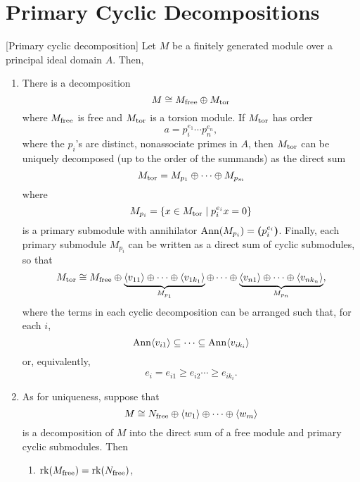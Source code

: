 \section{Primary Cyclic Decompositions}

\begin{thm}\label{thm:primary-cyclic-decomposition}
    {\rm[Primary cyclic decomposition]}
    Let\/ $M$ be a finitely generated module over a principal ideal domain\/ $A$. Then,

\begin{enumerate}[\rm a)]
    \item There is a decomposition
    $$
        M \cong M_{\rm free} \oplus M_{\rm tor}
    $$
    where\/ $M_{\rm free}$ is free and\/ $M_{\rm tor}$ is a torsion module. If\/ $M_{\rm tor}$ has order
    $$
        a=p_i^{e_1}\cdots p_n^{e_n},
    $$
    where the $p_i$'s are distinct, nonassociate primes in\/ $A$, then\/ $M_{\rm tor}$ can be uniquely decomposed (up to the order of the summands) as the direct sum
    $$
        M_{\rm tor} = M_{p_1} \oplus \cdots \oplus M_{p_m}
    $$
    where
    $$
        M_{p_i} = \{x \in M_{\rm tor} \mid p_i^{e_i}x=0\}
    $$
    is a primary submodule with annihilator\/ $\operatorname{\operatorname{Ann}}(M_{p_i}) = \textrm{\boldmath$($}p_i^{e_i}\textrm{\boldmath$)$}$. Finally, each primary submodule\/ $M_{p_i}$ can be written as a direct sum of cyclic submodules, so that
    \begin{equation}\label{eq:primary-cyclic-decomposition}
        M_{\text{tor}} \cong M_{\rm free}
            \oplus
            \underbrace{
            \langle v_{11}\rangle\oplus\cdots\oplus\langle v_{1k_1}\rangle
            }_{M_{p_1}}
            \oplus \cdots \oplus
            \underbrace{
            \langle v_{n1}\rangle\oplus\cdots\oplus\langle v_{nk_n}\rangle
            }_{M_{p_n}},
    \end{equation}
    where the terms in each cyclic decomposition can be arranged such that, for each\/ $i$,
    $$
        \operatorname{\operatorname{Ann}}\langle v_{i1}\rangle \subseteq \cdots \subseteq \operatorname{\operatorname{Ann}}\langle v_{ik_i}\rangle
    $$
    or, equivalently,
    \begin{equation}\label{eq:decreasing-elementary-exponents}
        e_i=e_{i1} \ge e_{i2} \cdots \ge e_{ik_i}.
    \end{equation}
    
    \item As for uniqueness, suppose that
    $$
        M \cong N_{\rm free} \oplus
            \langle w_1\rangle\oplus\cdots\oplus\langle w_m\rangle
    $$
    is a decomposition of\/ $M$ into the direct sum of a free module and primary cyclic submodules. Then
    \begin{enumerate}[\rm i)]
        \item $\operatorname{rk}(M_{\rm free}) = \operatorname{rk}(N_{\rm free})$,
        

\end{enumerate}
\end{enumerate}
\end{thm}

